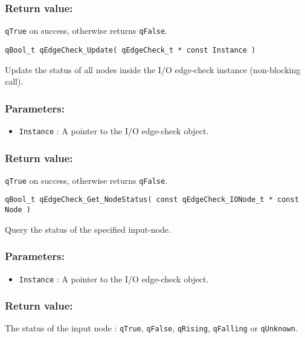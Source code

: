 \subsubsection*{Return value:}
\lstinline{qTrue} on success, otherwise returns \lstinline{qFalse}.


\noindent\hrulefill

\begin{lstlisting}[style=CStyle]
qBool_t qEdgeCheck_Update( qEdgeCheck_t * const Instance )
\end{lstlisting}

Update the status of all nodes inside the I/O edge-check instance (non-blocking call). 

\subsubsection*{Parameters:}
\begin{itemize}
    \item \lstinline{Instance} : A pointer to the I/O edge-check object.
\end{itemize}

\subsubsection*{Return value:}
\lstinline{qTrue} on success, otherwise returns \lstinline{qFalse}.


\noindent\hrulefill

\begin{lstlisting}[style=CStyle]
qBool_t qEdgeCheck_Get_NodeStatus( const qEdgeCheck_IONode_t * const Node )
\end{lstlisting}

Query the status of the specified input-node. 

\subsubsection*{Parameters:}
\begin{itemize}
    \item \lstinline{Instance} : A pointer to the I/O edge-check object.
\end{itemize}

\subsubsection*{Return value:}
The status of the input node : \lstinline{qTrue}, \lstinline{qFalse}, \lstinline{qRising}, \lstinline{qFalling} or \lstinline{qUnknown}.


